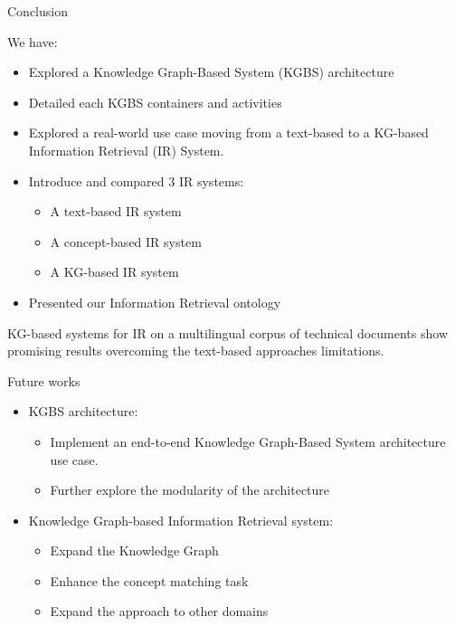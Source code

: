 \begin{frame}{Conclusion}

    We have:
    \begin{itemize}
        \item Explored a Knowledge Graph-Based System (KGBS) architecture
        \item Detailed each KGBS containers and activities
        \item Explored a real-world use case moving from a text-based to a KG-based Information Retrieval (IR) System.
        \item Introduce and compared $3$ IR systems:
        \begin{itemize}
            \item A text-based IR system
            \item A concept-based IR system
            \item A KG-based IR system
        \end{itemize}
        \item Presented our Information Retrieval ontology
    \end{itemize}

     \begin{center}
        KG-based systems for IR on a multilingual corpus of technical documents show promising results overcoming the text-based approaches limitations.   
     \end{center}

\end{frame}

\begin{frame}{Future works}

    \begin{itemize}
        \item KGBS architecture:
        \begin{itemize}
            \item Implement an end-to-end Knowledge Graph-Based System architecture use case.
            \item Further explore the modularity of the architecture
        \end{itemize}
        \item Knowledge Graph-based Information Retrieval system:
        \begin{itemize}
            \item Expand the Knowledge Graph
            \item Enhance the concept matching task
            \item Expand the approach to other domains
        \end{itemize}
    \end{itemize}

\end{frame}

